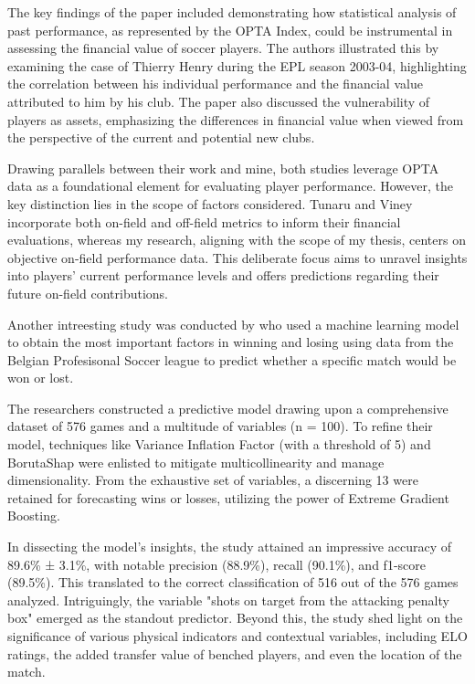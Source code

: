 \documentclass[12pt]{article}
\begin{document}
The key findings of the paper included demonstrating how statistical analysis of
past performance, as represented by the OPTA Index, could be instrumental in
assessing the financial value of soccer players. The authors illustrated this by
examining the case of Thierry Henry during the EPL season 2003-04, highlighting
the correlation between his individual performance and the financial value
attributed to him by his club. The paper also discussed the vulnerability of
players as assets, emphasizing the differences in financial value when viewed
from the perspective of the current and potential new clubs.

Drawing parallels between their work and mine, both studies leverage OPTA data
as a foundational element for evaluating player performance. However, the key
distinction lies in the scope of factors considered. Tunaru and Viney incorporate
both on-field and off-field metrics to inform their financial evaluations,
whereas my research, aligning with the scope of my thesis, centers on objective
on-field performance data. This deliberate focus aims to unravel insights into
players' current performance levels and offers predictions regarding their future
on-field contributions.


Another intreesting study was conducted by \citet{geurkink2021machine} who used
a machine learning model to obtain the most important factors in winning and
losing using data from the Belgian Profesisonal Soccer league to 
predict whether a specific match would be won or lost.

The researchers constructed a predictive
model drawing upon a comprehensive dataset of 576 games and a multitude of
variables (n = 100). To refine their model, techniques like Variance Inflation
Factor (with a threshold of 5) and BorutaShap were enlisted to mitigate
multicollinearity and manage dimensionality. From the exhaustive set of variables,
a discerning 13 were retained for forecasting wins or losses, utilizing the power of
Extreme Gradient Boosting.

In dissecting the model's insights, the study attained an impressive accuracy of
89.6\% ± 3.1\%, with notable precision (88.9\%), recall (90.1\%), and f1-score
(89.5\%). This translated to the correct classification of 516 out of the 576
games analyzed. Intriguingly, the variable "shots on target from the attacking
penalty box" emerged as the standout predictor. Beyond this, the study shed
light on the significance of various physical indicators and contextual
variables, including ELO ratings, the added transfer value of benched players,
and even the location of the match.
\end{document}
